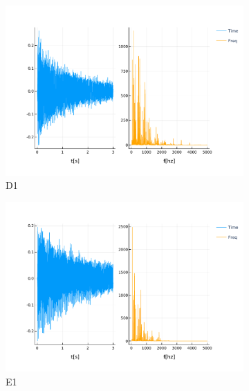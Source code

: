 \documentclass[12pt]{article}
\begin{document}
\begin{figure}[!ht]
	\centering
	\begin{subfigure}{.5\textwidth}
		\centering
		\includegraphics[width=1.0\linewidth]{assets/D1.pdf}
		\caption{D1}
		\label{fig:d1}
	\end{subfigure}%
	\begin{subfigure}{.5\textwidth}
		\centering
		\includegraphics[width=1.0\linewidth]{assets/E1.pdf}
		\caption{E1}
		\label{fig:e1}
	\end{subfigure}
	\caption{}
\end{figure}
\end{document}
